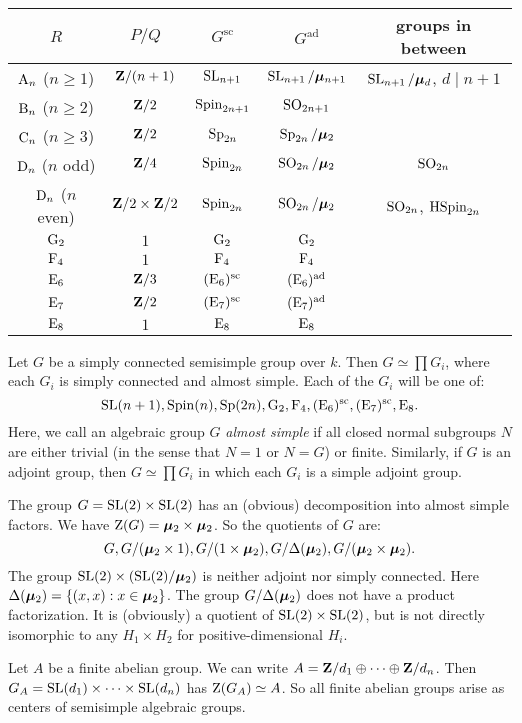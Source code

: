 \begin{center}
\begin{tabular}{c|c|c|c|c}
  $R$ 
    & $P/Q$ 
    & $G^\mathrm{sc}$ 
    & $G^\mathrm{ad}$ 
    & groups in between \\ \hline
  $\mathrm{A}_n$ ($n\geqslant 1$) 
    & $\mathbf{Z}/(n+1)$ 
    & $\operatorname{SL}_{n+1}$ 
    & $\operatorname{SL}_{n+1}/\bm{\mu}_{n+1}$ 
    & $\operatorname{SL}_{n+1}/\bm{\mu}_d$, $d\mid n+1$ \\ 
  $\mathrm{B}_n$ ($n\geqslant 2$) 
    & $\mathbf{Z}/2$ 
    & $\operatorname{Spin}_{2n+1}$ 
    & $\operatorname{SO}_{2n+1}$ \\
  $\mathrm{C}_n$ ($n\geqslant 3$) 
    & $\mathbf{Z}/2$ 
    & $\operatorname{Sp}_{2n}$ 
    & $\operatorname{Sp}_{2n}/\bm{\mu}_2$ \\
  $\mathrm{D}_n$ ($n$ odd) 
    & $\mathbf{Z}/4$ 
    & $\operatorname{Spin}_{2n}$ 
    & $\operatorname{SO}_{2n}/\bm{\mu}_2$ 
    & $\operatorname{SO}_{2n}$ \\
  $\mathrm{D}_n$ ($n$ even) 
    & $\mathbf{Z}/2\times \mathbf{Z}/2$ 
    & $\operatorname{Spin}_{2n}$ 
    & $\operatorname{SO}_{2n}/\bm{\mu}_2$ 
    & $\operatorname{SO}_{2n}$, $\operatorname{HSpin}_{2n}$ \\
  $\mathrm{G}_2$ 
    & $1$ 
    & $\mathrm{G}_2$ 
    & $\mathrm{G}_2$ \\
  $\mathrm{F}_4$ 
    & $1$ 
    & $\mathrm{F}_4$ 
    & $\mathrm{F}_4$ \\
  $\mathrm{E}_6$ 
    & $\mathbf{Z}/3$ 
    & $(\mathrm{E}_6)^\mathrm{sc}$ 
    & $(\mathrm{E}_6)^\mathrm{ad}$  \\
  $\mathrm{E}_7$ 
    & $\mathbf{Z}/2$ 
    & $(\mathrm{E}_7)^\mathrm{sc}$ 
    & $(\mathrm{E}_7)^\mathrm{ad}$ \\
  $\mathrm{E}_8$ 
    & $1$ 
    & $\mathrm{E}_8$ 
    & $\mathrm{E}_8$
\end{tabular}
\end{center}

Let $G$ be a simply connected semisimple group over $k$. Then 
$G\simeq \prod G_i$, where each $G_i$ is simply connected and almost 
simple. Each of the $G_i$ will be one of: 
\[
  \operatorname{SL}(n+1), \operatorname{Spin}(n), \operatorname{Sp}(2n), \mathrm{G}_2,\mathrm{F}_4,(\mathrm{E}_6)^\mathrm{sc},(\mathrm{E}_7)^\mathrm{sc},\mathrm{E}_8 .
\]
Here, we call an algebraic group $G$ \emph{almost simple} if all closed 
normal subgroups $N$ are either trivial (in the sense that $N=1$ or $N=G$) or 
finite. 
Similarly, if $G$ is an adjoint group, then $G\simeq \prod G_i$ in which 
each $G_i$ is a simple adjoint group. 

\begin{example}
The group $G=\operatorname{SL}(2)\times \operatorname{SL}(2)$ has an (obvious) decomposition into almost 
simple factors. We have $\operatorname{Z}(G)=\bm{\mu}_2\times \bm{\mu}_2$. So the quotients of 
$G$ are: 
\[
  G, G/(\bm{\mu}_2\times 1), G/(1\times \bm{\mu}_2), G/\Delta(\bm{\mu}_2),G/(\bm{\mu}_2\times \bm{\mu}_2) .
\]
The group $\operatorname{SL}(2)\times (\operatorname{SL}(2)/\bm{\mu}_2)$ is neither adjoint nor simply 
connected. Here $\Delta(\bm{\mu}_2)=\{(x,x):x\in \bm{\mu}_2\}$. The group 
$G/\Delta(\bm{\mu}_2)$ does not have a product factorization. It is (obviously) a 
quotient of $\operatorname{SL}(2)\times \operatorname{SL}(2)$, but is not directly isomorphic to any 
$H_1\times H_2$ for positive-dimensional $H_i$. 
\end{example}

\begin{example}
Let $A$ be a finite abelian group. We can write 
$A=\mathbf{Z}/d_1\oplus \cdots \oplus \mathbf{Z}/d_n$. Then 
$G_A=\operatorname{SL}(d_1)\times \cdots \times \operatorname{SL}(d_n)$ has $\operatorname{Z}(G_A)\simeq A$. So all 
finite abelian groups arise as centers of semisimple algebraic groups. 
\end{example}





